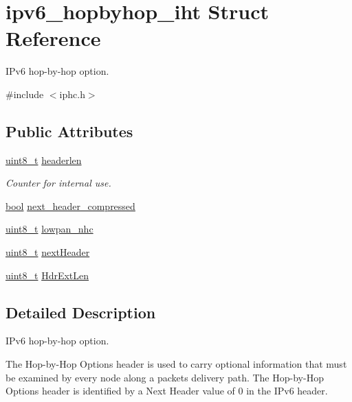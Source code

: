 \hypertarget{structipv6__hopbyhop__iht}{}\section{ipv6\+\_\+hopbyhop\+\_\+iht Struct Reference}
\label{structipv6__hopbyhop__iht}


I\+Pv6 hop-\/by-\/hop option.  




{\ttfamily \#include $<$iphc.\+h$>$}

\subsection*{Public Attributes}
\begin{DoxyCompactItemize}
\item 
\hyperlink{_p_e___types_8h_aba7bc1797add20fe3efdf37ced1182c5}{uint8\+\_\+t} \hyperlink{structipv6__hopbyhop__iht_a84ded5a6acf93585a72afb6c076378d3}{headerlen}
\begin{DoxyCompactList}\small\item\em Counter for internal use. \end{DoxyCompactList}\item 
\hyperlink{_p_e___types_8h_a97a80ca1602ebf2303258971a2c938e2}{bool} \hyperlink{structipv6__hopbyhop__iht_a10cac8444dcacb21635e9b460d68874c}{next\+\_\+header\+\_\+compressed}
\item 
\hyperlink{_p_e___types_8h_aba7bc1797add20fe3efdf37ced1182c5}{uint8\+\_\+t} \hyperlink{structipv6__hopbyhop__iht_a80be6ddea14a217b2d4192868a1e61ae}{lowpan\+\_\+nhc}
\item 
\hyperlink{_p_e___types_8h_aba7bc1797add20fe3efdf37ced1182c5}{uint8\+\_\+t} \hyperlink{structipv6__hopbyhop__iht_a22de87aa82608d6222ea1dfd254ca29c}{next\+Header}
\item 
\hyperlink{_p_e___types_8h_aba7bc1797add20fe3efdf37ced1182c5}{uint8\+\_\+t} \hyperlink{structipv6__hopbyhop__iht_af74b3cb3f3fbaaa924299aefa0def813}{Hdr\+Ext\+Len}
\end{DoxyCompactItemize}


\subsection{Detailed Description}
I\+Pv6 hop-\/by-\/hop option. 

The Hop-\/by-\/\+Hop Options header is used to carry optional information that must be examined by every node along a packet\textquotesingle{}s delivery path. The Hop-\/by-\/\+Hop Options header is identified by a Next Header value of 0 in the I\+Pv6 header.

